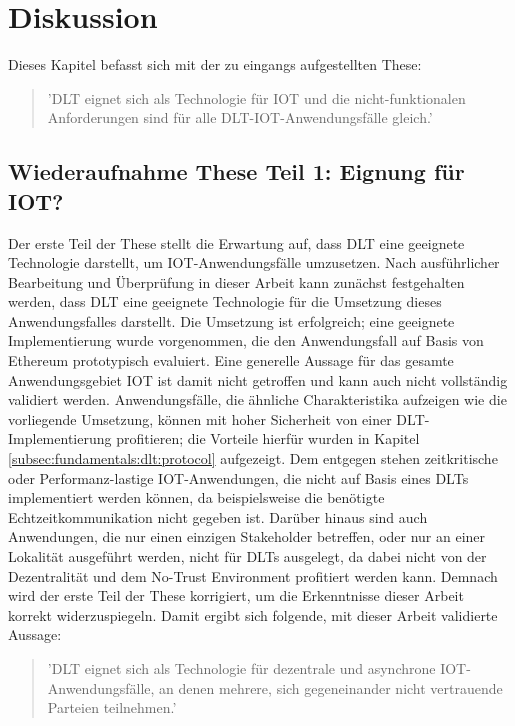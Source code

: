 \chapter{Diskussion}
\label{ch:discussion}
Dieses Kapitel befasst sich mit der zu eingangs aufgestellten These:
\begin{quote}
  '\ac{DLT} eignet sich als Technologie für \ac{IOT} und die nicht-funktionalen Anforderungen sind für alle \ac{DLT}-\ac{IOT}-Anwendungsfälle gleich.'
\end{quote}


\section{Wiederaufnahme These Teil 1: Eignung für IOT?}
\label{sec:discussion:part1}
Der erste Teil der These stellt die Erwartung auf, dass \ac{DLT} eine geeignete Technologie darstellt, um \ac{IOT}-Anwendungsfälle umzusetzen. Nach ausführlicher Bearbeitung und Überprüfung in dieser Arbeit kann zunächst festgehalten werden, dass \ac{DLT} eine geeignete Technologie für die Umsetzung dieses Anwendungsfalles darstellt. Die Umsetzung ist erfolgreich; eine geeignete Implementierung wurde vorgenommen, die den Anwendungsfall auf Basis von Ethereum prototypisch evaluiert. Eine generelle Aussage für das gesamte Anwendungsgebiet \ac{IOT} ist damit nicht getroffen und kann auch nicht vollständig validiert werden. Anwendungsfälle, die ähnliche Charakteristika aufzeigen wie die vorliegende Umsetzung, können mit hoher Sicherheit von einer \ac{DLT}-Implementierung profitieren; die Vorteile hierfür wurden in Kapitel \ref{subsec:fundamentals:dlt:protocol} aufgezeigt. Dem entgegen stehen zeitkritische oder Performanz-lastige \ac{IOT}-Anwendungen, die nicht auf Basis eines \ac{DLT}s implementiert werden können, da beispielsweise die benötigte Echtzeitkommunikation nicht gegeben ist. Darüber hinaus sind auch Anwendungen, die nur einen einzigen Stakeholder betreffen, oder nur an einer Lokalität ausgeführt werden, nicht für \ac{DLT}s ausgelegt, da dabei nicht von der Dezentralität und dem No-Trust Environment profitiert werden kann. Demnach wird der erste Teil der These korrigiert, um die Erkenntnisse dieser Arbeit korrekt widerzuspiegeln. Damit ergibt sich folgende, mit dieser Arbeit validierte Aussage:
\begin{quote}
  '\ac{DLT} eignet sich als Technologie für dezentrale und asynchrone \ac{IOT}-Anwendungsfälle, an denen mehrere, sich gegeneinander nicht vertrauende Parteien teilnehmen.'
\end{quote}

